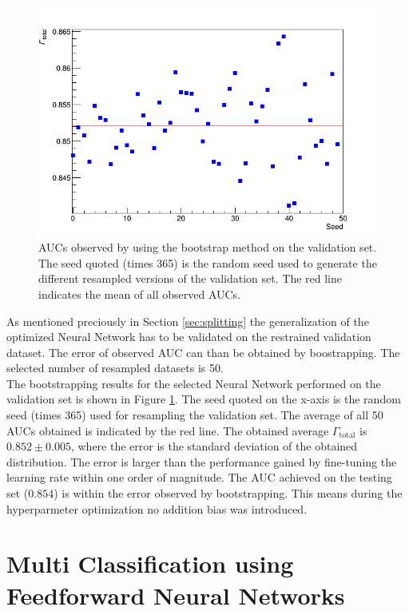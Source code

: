 \begin{figure}[H]
\centering
\includegraphics[width=\linewidth]{figs/FNN/BootStrap}
\caption{AUCs observed by using the bootstrap method on the validation set. The seed quoted (times 365) is the random seed used to generate the different resampled versions of the validation set. The red line indicates the mean of all observed AUCs.}
\label{fig:BootStrapFNN}
\end{figure}

As mentioned preciously in Section \ref{sec:splitting} the generalization of the optimized Neural Network has to be validated on the restrained validation dataset. The error of observed AUC can than be obtained by boostrapping. The selected number of resampled datasets is 50. \\
The bootstrapping results for the selected Neural Network performed on the validation set is shown in Figure \ref{fig:BootStrapFNN}. The seed quoted on the x-axis is the random seed (times 365) used for resampling the validation set. The average of all 50 AUCs obtained is indicated by the red line.
The obtained average $\Gamma_{\text{total}}$  is $0.852 \pm 0.005$, where the error is the standard deviation of the obtained distribution. The error is larger than the performance gained by fine-tuning the learning rate within one order of magnitude. The AUC achieved on the testing set ($0.854$) is within the error observed by bootstrapping. This means during the hyperparmeter optimization no addition bias was introduced.


\newpage

\section{Multi Classification using Feedforward Neural Networks}
\label{sec:Multi}

